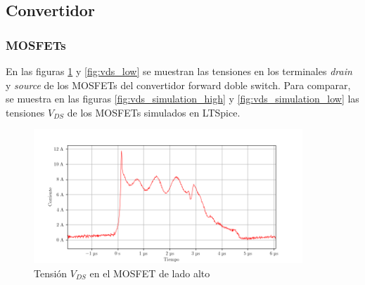 








\subsection{Convertidor}

\subsubsection{MOSFETs}



En las figuras \ref{fig:vds_high} y \ref{fig:vds_low} se muestran las tensiones en los terminales \textit{drain} y \textit{source} de los MOSFETs del convertidor forward doble switch.
Para comparar, se muestra en las figuras \ref{fig:vds_simulation_high} y \ref{fig:vds_simulation_low} las tensiones $V_{DS}$ de los MOSFETs simulados en LTSpice. 

\begin{figure}[H]
    \centering
    \includegraphics[width=0.9\textwidth]{images/capturas-osciloscopio/17-11-2022/33.png}
    \caption{Tensión $V_{DS}$ en el MOSFET de lado alto}
    \label{fig:vds_high}
\end{figure}

